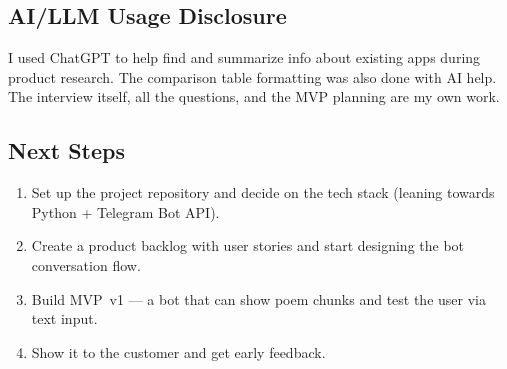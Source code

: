 \documentclass[11pt, a4paper]{article}
\begin{document}
\subsection*{AI/LLM Usage Disclosure}
I used ChatGPT to help find and summarize info about existing apps during product research. The comparison table formatting was also done with AI help. The interview itself, all the questions, and the MVP planning are my own work.

\subsection*{Next Steps}
\begin{enumerate}
    \item Set up the project repository and decide on the tech stack (leaning towards Python + Telegram Bot API).
    \item Create a product backlog with user stories and start designing the bot conversation flow.
    \item Build MVP~v1 --- a bot that can show poem chunks and test the user via text input.
    \item Show it to the customer and get early feedback.
\end{enumerate}
\end{document}
